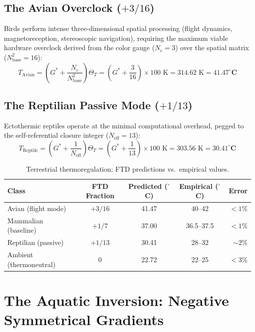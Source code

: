 \documentclass[11pt, letterpaper]{article}
\newcommand{\G}{G^*}
\theoremstyle{definition}
\theoremstyle{remark}
\begin{document}
\subsection{The Avian Overclock ($+3/16$)}

Birds perform intense three-dimensional spatial processing (flight dynamics, magnetoreception, stereoscopic navigation), requiring the maximum viable hardware overclock derived from the color gauge ($N_c = 3$) over the spatial matrix ($N_{\text{base}}^2 = 16$):
\begin{equation}
    T_{\text{Avian}} = \left(\G + \frac{N_c}{N_{\text{base}}^2}\right)\Theta_T = \left(\G + \frac{3}{16}\right) \times 100 \text{ K} = 314.62 \text{ K} = \mathbf{41.47^\circ\text{C}}
\end{equation}

\subsection{The Reptilian Passive Mode ($+1/13$)}

Ectothermic reptiles operate at the minimal computational overhead, pegged to the self-referential closure integer ($N_{\text{eff}} = 13$):
\begin{equation}
    T_{\text{Reptile}} = \left(\G + \frac{1}{N_{\text{eff}}}\right)\Theta_T = \left(\G + \frac{1}{13}\right) \times 100 \text{ K} = 303.56 \text{ K} = \mathbf{30.41^\circ\text{C}}
\end{equation}

\begin{table}[hbt!]
\centering
\caption{Terrestrial thermoregulation: FTD predictions vs.\ empirical values.}
\label{tab:terrestrial}
\begin{tabular}{@{}lcccr@{}}
\toprule
\textbf{Class} & \textbf{FTD Fraction} & \textbf{Predicted ($^\circ$C)} & \textbf{Empirical ($^\circ$C)} & \textbf{Error} \\
\midrule
Avian (flight mode) & $+3/16$ & 41.47 & 40--42 & $<1\%$ \\
Mammalian (baseline) & $+1/7$ & 37.00 & 36.5--37.5 & $<1\%$ \\
Reptilian (passive) & $+1/13$ & 30.41 & 28--32 & $\sim 2\%$ \\
Ambient (thermoneutral) & $0$ & 22.72 & 22--25 & $<3\%$ \\
\bottomrule
\end{tabular}
\end{table}

\section{The Aquatic Inversion: Negative Symmetrical Gradients}
\end{document}
